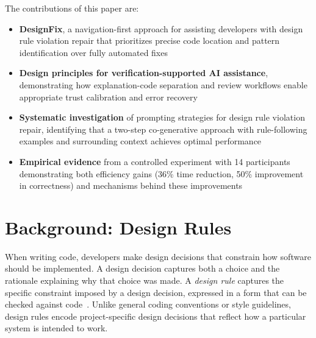 \documentclass[conference]{IEEEtran}
\begin{document}

The contributions of this paper are:

\begin{itemize}
\item \textbf{DesignFix}, a navigation-first approach for assisting developers with design rule violation repair that prioritizes precise code location and pattern identification over fully automated fixes
\item \textbf{Design principles for verification-supported AI assistance}, demonstrating how explanation-code separation and review workflows enable appropriate trust calibration and error recovery
\item \textbf{Systematic investigation} of prompting strategies for design rule violation repair, identifying that a two-step co-generative approach with rule-following examples and surrounding context achieves optimal performance
\item \textbf{Empirical evidence} from a controlled experiment with 14 participants demonstrating both efficiency gains (36\% time reduction, 50\% improvement in correctness) and  mechanisms behind these improvements
\end{itemize}

\section{Background: Design Rules}

When writing code, developers make design decisions that constrain how software should be implemented. A design decision captures both a choice and the rationale explaining why that choice was made. A \textit{design rule} captures the specific constraint imposed by a design decision, expressed in a form that can be checked against code~\cite{mehrpour2019active}. Unlike general coding conventions or style guidelines, design rules encode project-specific design decisions that reflect how a particular system is intended to work.
\end{document}
